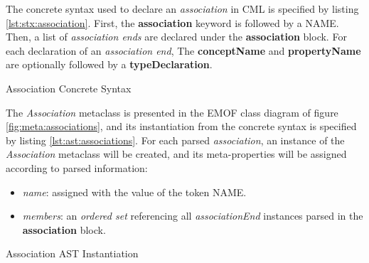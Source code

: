The concrete syntax used to declare an \emph{association} in CML
is specified by listing \ref{lst:stx:association}.
First, the \textbf{association} keyword is followed by a NAME.
Then, a list of \emph{association ends} are declared under the \textbf{association} block.
For each declaration of an \emph{association end},
The \textbf{conceptName} and \textbf{propertyName} are optionally followed by a \textbf{typeDeclaration}.

\begin{code}
\verbatimfont{\small}

\caption{Association Concrete Syntax}
\label{lst:stx:association}
\end{code}

The \emph{Association} metaclass is presented 
in the EMOF \cite{mof} class diagram of figure \ref{fig:meta:associations},
and its instantiation from the concrete syntax is specified by listing \ref{lst:ast:associations}.
For each parsed \emph{association},
an instance of the \emph{Association} metaclass will be created,
and its meta-properties will be assigned
according to parsed information:

\begin{itemize}

\item \emph{name}:
assigned with the value of the token NAME.

\item \emph{members}:
an \emph{ordered set} referencing all \emph{associationEnd}
instances parsed in the \textbf{association} block.

\end{itemize}

\begin{code}
\verbatimfont{\small}

\caption{Association AST Instantiation}
\label{lst:ast:associations}
\end{code}
